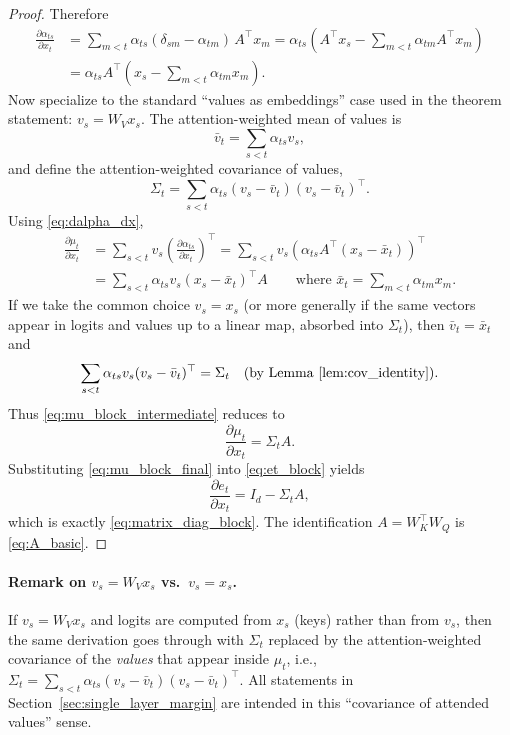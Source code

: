 \documentclass[11pt]{article}
\begin{document}
\begin{proof}
Therefore
\begin{align}
\frac{\partial \alpha_{ts}}{\partial x_t}
&=
\sum_{m<t}\alpha_{ts}(\delta_{sm}-\alpha_{tm})\,A^\top x_m
=
\alpha_{ts}\left(A^\top x_s-\sum_{m<t}\alpha_{tm}A^\top x_m\right)\nonumber\\
&=
\alpha_{ts}A^\top\left(x_s-\sum_{m<t}\alpha_{tm}x_m\right).
\label{eq:dalpha_dx}
\end{align}
Now specialize to the standard ``values as embeddings'' case used in the theorem statement:
$v_s=W_V x_s$. The attention-weighted mean of values is
\[
\bar v_t=\sum_{s<t}\alpha_{ts}v_s,
\]
and define the attention-weighted covariance of values,
\[
\Sigma_t=\sum_{s<t}\alpha_{ts}(v_s-\bar v_t)(v_s-\bar v_t)^\top.
\]
Using \eqref{eq:dalpha_dx},
\begin{align}
\frac{\partial \mu_t}{\partial x_t}
&=
\sum_{s<t} v_s\left(\frac{\partial \alpha_{ts}}{\partial x_t}\right)^\top
=
\sum_{s<t} v_s\left(\alpha_{ts}A^\top(x_s-\bar x_t)\right)^\top \nonumber\\
&=
\sum_{s<t} \alpha_{ts} v_s (x_s-\bar x_t)^\top A
\qquad\text{where }\bar x_t=\sum_{m<t}\alpha_{tm}x_m. 
\label{eq:mu_block_intermediate}
\end{align}
If we take the common choice $v_s=x_s$ (or more generally if the same vectors appear in logits and values
up to a linear map, absorbed into $\Sigma_t$), then $\bar v_t=\bar x_t$ and
\[
\sum_{s<t} \alpha_{ts} v_s (v_s-\bar v_t)^\top = \Sigma_t
\quad\text{(by Lemma~\ref{lem:cov_identity})}.
\]
Thus \eqref{eq:mu_block_intermediate} reduces to
\begin{equation}
\frac{\partial \mu_t}{\partial x_t}
=
\Sigma_t A.
\label{eq:mu_block_final}
\end{equation}
Substituting \eqref{eq:mu_block_final} into \eqref{eq:et_block} yields
\[
\frac{\partial e_t}{\partial x_t}
=
I_d-\Sigma_t A,
\]
which is exactly \eqref{eq:matrix_diag_block}. The identification $A=W_K^\top W_Q$ is \eqref{eq:A_basic}.
\end{proof}

\paragraph{Remark on $v_s=W_Vx_s$ vs.\ $v_s=x_s$.}
If $v_s=W_Vx_s$ and logits are computed from $x_s$ (keys) rather than from $v_s$, then the same derivation
goes through with $\Sigma_t$ replaced by the attention-weighted covariance of the \emph{values} that appear
inside $\mu_t$, i.e.,
$\Sigma_t=\sum_{s<t}\alpha_{ts}(v_s-\bar v_t)(v_s-\bar v_t)^\top$.
All statements in Section~\ref{sec:single_layer_margin} are intended in this ``covariance of attended values''
sense.
\end{document}

